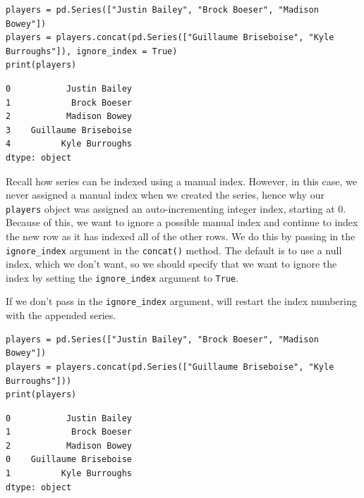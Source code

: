 \begin{lstlisting}[style=pippython]
players = pd.Series(["Justin Bailey", "Brock Boeser", "Madison Bowey"])
players = players.concat(pd.Series(["Guillaume Briseboise", "Kyle Burroughs"]), ignore_index = True)
print(players)
\end{lstlisting}
\begin{lstlisting}[style=none]
0           Justin Bailey
1            Brock Boeser
2           Madison Bowey
3    Guillaume Briseboise
4          Kyle Burroughs
dtype: object
\end{lstlisting}
Recall how series can be indexed using a manual index. However, in this case, we never assigned a manual index when we created the series, hence why our \verb|players| object was assigned an auto-incrementing integer index, starting at 0. Because of this, we want  to ignore a possible manual index and continue to index the new row as it has indexed all of the other rows. We do this by passing in the \verb|ignore_index| argument in the \verb|concat()| method. The default is to use a null index, which we don't want, so we should specify that we want to ignore the index by setting the \verb|ignore_index| argument to \verb|True|.\par
If we don't pass in the \verb|ignore_index| argument,  will restart the index numbering with the appended series.\par
\begin{lstlisting}[style=pippython]
players = pd.Series(["Justin Bailey", "Brock Boeser", "Madison Bowey"])
players = players.concat(pd.Series(["Guillaume Briseboise", "Kyle Burroughs"]))
print(players)
\end{lstlisting}
\begin{lstlisting}[style=none]
0           Justin Bailey
1            Brock Boeser
2           Madison Bowey
0    Guillaume Briseboise
1          Kyle Burroughs
dtype: object
\end{lstlisting}

